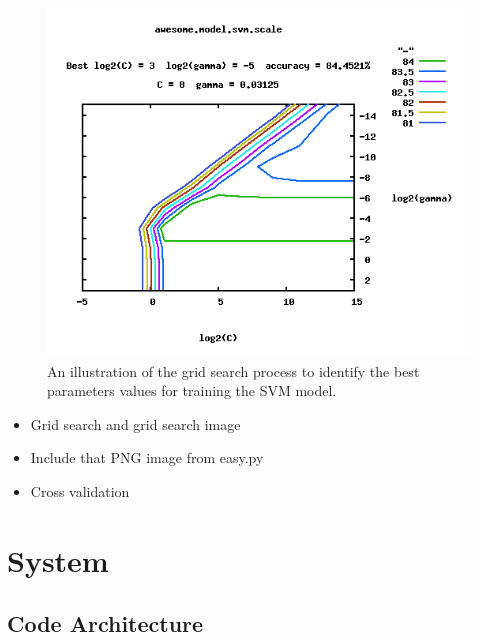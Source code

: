 \documentclass[preprint]{style}
\begin{document}
\begin{figure}
\begin{center}
	\includegraphics[width=1\columnwidth]{figures/parameter-selection.png}
\end{center}
\caption{An illustration of the grid search process to identify the best parameters values for training the SVM model.}
\label{fig:parameter_selection}
\end{figure}

\begin{itemize}

\item Grid search and grid search image

\item Include that PNG image from easy.py

\item Cross validation

\end{itemize}




\section{System}

\subsection{Code Architecture}
\end{document}
